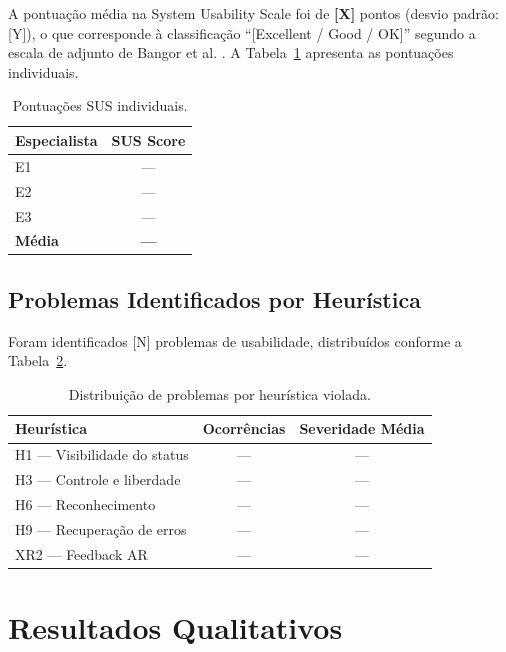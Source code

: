 \documentclass[
  12pt,
  openright,
  twoside,
  a4paper,
  english,
  brazil
]{abntex2}
\begin{document}
A pontuação média na System Usability Scale foi de \textbf{[X]} pontos
(desvio padrão: [Y]), o que corresponde à classificação ``[Excellent /
Good / OK]'' segundo a escala de adjunto de Bangor et al. \cite{bangor2008sus}.
A Tabela~\ref{tab:sus} apresenta as pontuações individuais.

\begin{table}[ht]
  \caption{Pontuações SUS individuais.}
  \label{tab:sus}
  \centering
  \begin{tabular}{lc}
    \toprule
    \textbf{Especialista} & \textbf{SUS Score} \\
    \midrule
    E1 & --- \\
    E2 & --- \\
    E3 & --- \\
    \midrule
    \textbf{Média} & \textbf{---} \\
    \bottomrule
  \end{tabular}
\end{table}

\subsection{Problemas Identificados por Heurística}
\label{subsec:problemas}

Foram identificados [N] problemas de usabilidade, distribuídos conforme
a Tabela~\ref{tab:heuristicas}.

\begin{table}[ht]
  \caption{Distribuição de problemas por heurística violada.}
  \label{tab:heuristicas}
  \centering
  \begin{tabular}{lcc}
    \toprule
    \textbf{Heurística} & \textbf{Ocorrências} & \textbf{Severidade Média} \\
    \midrule
    H1 — Visibilidade do status & --- & --- \\
    H3 — Controle e liberdade  & --- & --- \\
    H6 — Reconhecimento        & --- & --- \\
    H9 — Recuperação de erros  & --- & --- \\
    XR2 — Feedback AR          & --- & --- \\
    \bottomrule
  \end{tabular}
\end{table}

\section{Resultados Qualitativos}
\label{sec:resultados-qual}
\end{document}
